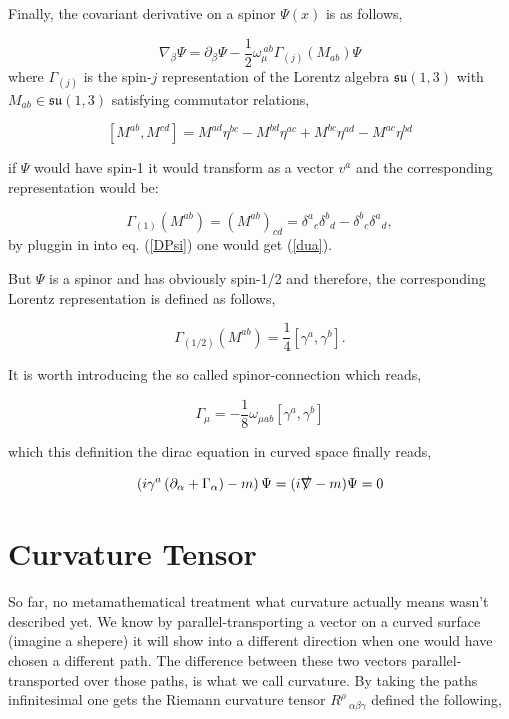 \documentclass[12pt,a4paper]{article}
\begin{document}
	Finally, the covariant derivative on a spinor $\Psi(x)$ is as follows,
	
	\begin{equation}
		\label{DPsi}
		\nabla_\beta \Psi = \partial_\beta \Psi - \frac{1}{2} \omega_\mu^{\ a b }\Gamma_{(j)}(M_{a b})\Psi
	\end{equation}
	where $\Gamma_{(j)}$ is the spin-$j$ representation of the Lorentz algebra $\mathfrak{su}(1,3)$
	with $M_{a b} \in \mathfrak{su}(1,3)$ satisfying commutator relations,
	
	$$
	[M^{a b },M^{c d }]=M^{a d }\eta ^{b c }-M^{b d }\eta ^{a c }+M^{b c }\eta ^{a d }-M^{a c }\eta ^{b d }
	$$
	
	if $\Psi$ would have spin-1 it would transform as a vector $v^a$ and the corresponding representation would be:
	
	$$
	\Gamma_{(1)}(M^{a b }) = (M^{a b })_{c d }=\delta ^{a }{}_{c }\delta ^{b }{}_{d }-\delta ^{b }{}_{c }\delta ^{a }{}_{d },
	$$
	by pluggin in into eq. (\ref{DPsi}) one would get (\ref{dua}).
	
	But $\Psi$ is a spinor and has obviously spin-1/2 and therefore, the corresponding Lorentz representation is defined as follows,
	
	$$
	\Gamma_{(1/2)}(M^{a b }) = \frac{1}{4}[\gamma^a, \gamma^b].
	$$
	
	It is worth introducing the so called spinor-connection which reads,
	
	$$
	\Gamma_\mu = -\frac{1}{8} \omega_{\mu a b}[\gamma^a, \gamma^b]
	$$

	which this definition the dirac equation in curved space finally reads,
	
	
	\begin{equation}
		\label{dirac_in_curved}
	\left(i\gamma^a \left( \partial_\alpha + \Gamma_\alpha \right)-m\right)\Psi = (i\slashed{\nabla} - m)\Psi = 0
	\end{equation}
	\section{Curvature Tensor}
	So far, no metamathematical treatment what curvature actually means wasn't described yet.  We know by parallel-transporting a vector on a curved surface (imagine a shepere) it will show into a different direction when one would have chosen a different path. The difference between these two vectors parallel-transported over those paths, is what we call curvature. By taking the paths infinitesimal one gets the Riemann curvature tensor $R^\rho\,_{\alpha \beta  \gamma }$ defined the following,
	
\end{document}
